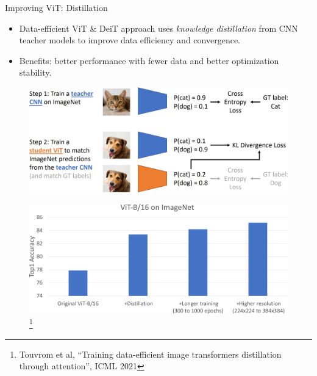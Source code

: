 \begin{frame}[allowframebreaks]{Improving ViT: Distillation}
    \begin{itemize}
        \item Data-efficient ViT \& DeiT approach uses \textit{knowledge distillation} from CNN teacher models to improve data efficiency and convergence.
        \item Benefits: better performance with fewer data and better optimization stability.
    \end{itemize}
    \framebreak
    \begin{figure}
        \centering
        \includegraphics[width=\linewidth,height=0.9\textheight,keepaspectratio]{images/vit/slide_65_1_img.jpg}
    \end{figure}

    \framebreak

    \begin{figure}
        \centering
        \includegraphics[width=\linewidth,height=\textheight,keepaspectratio]{images/vit/slide_66_1_img.png}
        \footnote{Touvrom et al, “Training data-efficient image transformers distillation through attention”, ICML 2021}
    \end{figure}
\end{frame}